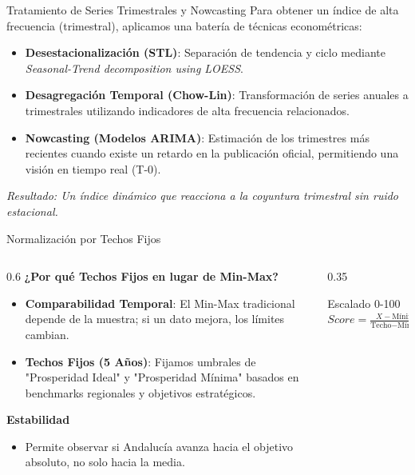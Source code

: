 \documentclass[10pt, aspectratio=169]{beamer}
\begin{document}
\begin{frame}{Tratamiento de Series Trimestrales y Nowcasting}
    \small
    Para obtener un índice de alta frecuencia (trimestral), aplicamos una batería de técnicas econométricas:
    \vspace{0.3cm}
    \begin{itemize}
        \item \textbf{Desestacionalización (STL)}: 
              Separación de tendencia y ciclo mediante \textit{Seasonal-Trend decomposition using LOESS}.
        \item \textbf{Desagregación Temporal (Chow-Lin)}: 
              Transformación de series anuales a trimestrales utilizando indicadores de alta frecuencia relacionados.
        \item \textbf{Nowcasting (Modelos ARIMA)}: 
              Estimación de los trimestres más recientes cuando existe un retardo en la publicación oficial, permitiendo una visión en tiempo real (T-0).
    \end{itemize}
    \vfill
    \begin{center}
        \textit{Resultado: Un índice dinámico que reacciona a la coyuntura trimestral sin ruido estacional.}
    \end{center}
\end{frame}

\begin{frame}{Normalización por Techos Fijos}
    \begin{columns}
        \begin{column}{0.6\textwidth}
            \textbf{\textcolor{brandgreen}{¿Por qué Techos Fijos en lugar de Min-Max?}}
            \begin{itemize}
                \item \textbf{Comparabilidad Temporal}: El Min-Max tradicional depende de la muestra; si un dato mejora, los límites cambian.
                \item \textbf{Techos Fijos (5 Años)}: Fijamos umbrales de "Prosperidad Ideal" y "Prosperidad Mínima" basados en benchmarks regionales y objetivos estratégicos.
            \end{itemize}
            \vspace{0.3cm}
            \textbf{\textcolor{brandgreen}{Estabilidad}}
            \begin{itemize}
                \item Permite observar si Andalucía avanza hacia el objetivo absoluto, no solo hacia la media.
            \end{itemize}
        \end{column}
        \begin{column}{0.35\textwidth}
            \begin{exampleblock}{Escalado 0-100}
                \centering
                $Score = \frac{X - \text{Mínimo}}{\text{Techo} - \text{Mínimo}} \times 100$
            \end{exampleblock}
        \end{column}
    \end{columns}
\end{frame}
\end{document}
